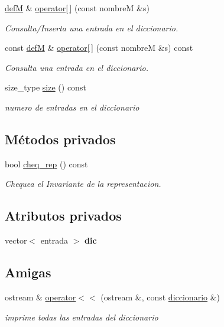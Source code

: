 \begin{DoxyCompactItemize}
\hyperlink{classdefM}{def\-M} \& \hyperlink{classdiccionario_a8b2ac04f691e925d86967bbd62670a4d}{operator\mbox{[}$\,$\mbox{]}} (const nombre\-M \&s)
\begin{DoxyCompactList}\small\item\em Consulta/\-Inserta una entrada en el diccionario. \end{DoxyCompactList}\item 
const \hyperlink{classdefM}{def\-M} \& \hyperlink{classdiccionario_a1dbf7b521d4ac17e0bcd5d3e5ecff93d}{operator\mbox{[}$\,$\mbox{]}} (const nombre\-M \&s) const 
\begin{DoxyCompactList}\small\item\em Consulta una entrada en el diccionario. \end{DoxyCompactList}\item 
size\-\_\-type \hyperlink{classdiccionario_a441fdeeb87c717757f5f7ff50612d57e}{size} () const 
\begin{DoxyCompactList}\small\item\em numero de entradas en el diccionario \end{DoxyCompactList}\end{DoxyCompactItemize}
\subsection*{Métodos privados}
\begin{DoxyCompactItemize}
\item 
bool \hyperlink{classdiccionario_a0af2e538b04d23e6b42e63060c1cf002}{cheq\-\_\-rep} () const 
\begin{DoxyCompactList}\small\item\em Chequea el Invariante de la representacion. \end{DoxyCompactList}\end{DoxyCompactItemize}
\subsection*{Atributos privados}
\begin{DoxyCompactItemize}
\item 
\hypertarget{classdiccionario_ac076e11d1d19be05e28d8a83b2ade886}{vector$<$ entrada $>$ {\bfseries dic}}\label{classdiccionario_ac076e11d1d19be05e28d8a83b2ade886}

\end{DoxyCompactItemize}
\subsection*{Amigas}
\begin{DoxyCompactItemize}
\item 
ostream \& \hyperlink{classdiccionario_a516e0071b7e529b4d37892ffb12247ef}{operator$<$$<$} (ostream \&, const \hyperlink{classdiccionario}{diccionario} \&)
\begin{DoxyCompactList}\small\item\em imprime todas las entradas del diccionario \end{DoxyCompactList}\end{DoxyCompactItemize}


